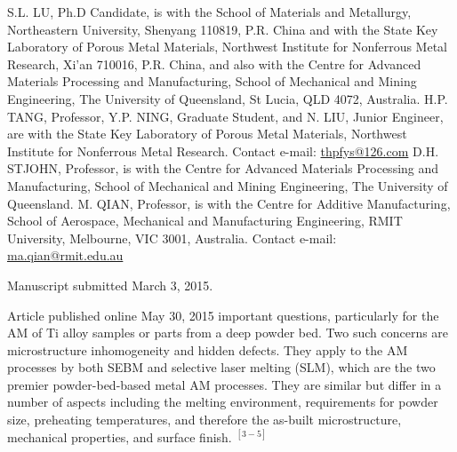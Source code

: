 \documentclass[10pt]{article}
\begin{document}
S.L. LU, Ph.D Candidate, is with the School of Materials and Metallurgy, Northeastern University, Shenyang 110819, P.R. China and with the State Key Laboratory of Porous Metal Materials, Northwest Institute for Nonferrous Metal Research, Xi'an 710016, P.R. China, and also with the Centre for Advanced Materials Processing and Manufacturing, School of Mechanical and Mining Engineering, The University of Queensland, St Lucia, QLD 4072, Australia. H.P. TANG, Professor, Y.P. NING, Graduate Student, and N. LIU, Junior Engineer, are with the State Key Laboratory of Porous Metal Materials, Northwest Institute for Nonferrous Metal Research. Contact e-mail: \href{mailto:thpfys@126.com}{thpfys@126.com} D.H. STJOHN, Professor, is with the Centre for Advanced Materials Processing and Manufacturing, School of Mechanical and Mining Engineering, The University of Queensland. M. QIAN, Professor, is with the Centre for Additive Manufacturing, School of Aerospace, Mechanical and Manufacturing Engineering, RMIT University, Melbourne, VIC 3001, Australia. Contact e-mail: \href{mailto:ma.qian@rmit.edu.au}{ma.qian@rmit.edu.au}

Manuscript submitted March 3, 2015.

Article published online May 30, 2015 important questions, particularly for the $\mathrm{AM}$ of $\mathrm{Ti}$ alloy samples or parts from a deep powder bed. Two such concerns are microstructure inhomogeneity and hidden defects. They apply to the AM processes by both SEBM and selective laser melting (SLM), which are the two premier powder-bed-based metal AM processes. They are similar but differ in a number of aspects including the melting environment, requirements for powder size, preheating temperatures, and therefore the as-built microstructure, mechanical properties, and surface finish. ${ }^{[3-5]}$
\end{document}
